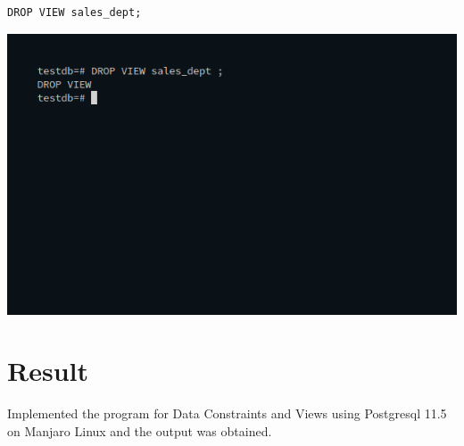 \begin{enumerate}
\begin{verbatim}
DROP VIEW sales_dept;

\end{verbatim}
\newline
\includegraphics[width=\linewidth]{../Images/Constraints/20.png}\newline

\end{enumerate}



\section{Result}
Implemented the program for Data Constraints and Views using Postgresql 11.5 on Manjaro Linux and the output was obtained.